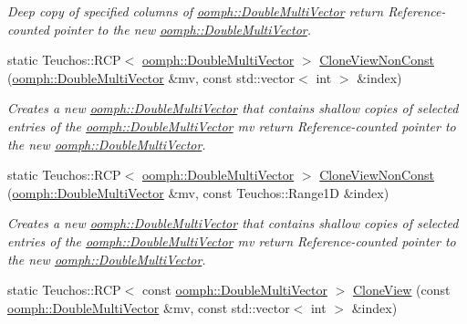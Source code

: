 \begin{DoxyCompactItemize}
\begin{DoxyCompactList}\small\item\em Deep copy of specified columns of \hyperlink{classoomph_1_1DoubleMultiVector}{oomph\+::\+Double\+Multi\+Vector} return Reference-\/counted pointer to the new \hyperlink{classoomph_1_1DoubleMultiVector}{oomph\+::\+Double\+Multi\+Vector}. \end{DoxyCompactList}\item 
static Teuchos\+::\+R\+CP$<$ \hyperlink{classoomph_1_1DoubleMultiVector}{oomph\+::\+Double\+Multi\+Vector} $>$ \hyperlink{classAnasazi_1_1MultiVecTraits_3_01double_00_01oomph_1_1DoubleMultiVector_01_4_a74ddaaa62a646c5e4696b964eb1ef745}{Clone\+View\+Non\+Const} (\hyperlink{classoomph_1_1DoubleMultiVector}{oomph\+::\+Double\+Multi\+Vector} \&mv, const std\+::vector$<$ int $>$ \&index)
\begin{DoxyCompactList}\small\item\em Creates a new \hyperlink{classoomph_1_1DoubleMultiVector}{oomph\+::\+Double\+Multi\+Vector} that contains shallow copies of selected entries of the \hyperlink{classoomph_1_1DoubleMultiVector}{oomph\+::\+Double\+Multi\+Vector} mv return Reference-\/counted pointer to the new \hyperlink{classoomph_1_1DoubleMultiVector}{oomph\+::\+Double\+Multi\+Vector}. \end{DoxyCompactList}\item 
static Teuchos\+::\+R\+CP$<$ \hyperlink{classoomph_1_1DoubleMultiVector}{oomph\+::\+Double\+Multi\+Vector} $>$ \hyperlink{classAnasazi_1_1MultiVecTraits_3_01double_00_01oomph_1_1DoubleMultiVector_01_4_ac62500686b329e6fccfd97356a31ca8e}{Clone\+View\+Non\+Const} (\hyperlink{classoomph_1_1DoubleMultiVector}{oomph\+::\+Double\+Multi\+Vector} \&mv, const Teuchos\+::\+Range1D \&index)
\begin{DoxyCompactList}\small\item\em Creates a new \hyperlink{classoomph_1_1DoubleMultiVector}{oomph\+::\+Double\+Multi\+Vector} that contains shallow copies of selected entries of the \hyperlink{classoomph_1_1DoubleMultiVector}{oomph\+::\+Double\+Multi\+Vector} mv return Reference-\/counted pointer to the new \hyperlink{classoomph_1_1DoubleMultiVector}{oomph\+::\+Double\+Multi\+Vector}. \end{DoxyCompactList}\item 
static Teuchos\+::\+R\+CP$<$ const \hyperlink{classoomph_1_1DoubleMultiVector}{oomph\+::\+Double\+Multi\+Vector} $>$ \hyperlink{classAnasazi_1_1MultiVecTraits_3_01double_00_01oomph_1_1DoubleMultiVector_01_4_a9f09feafb7d8303d11253186d39104b7}{Clone\+View} (const \hyperlink{classoomph_1_1DoubleMultiVector}{oomph\+::\+Double\+Multi\+Vector} \&mv, const std\+::vector$<$ int $>$ \&index)

\end{DoxyCompactItemize}
